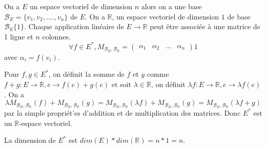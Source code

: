 \documentclass[]{book}
\theoremstyle{definition}
\newcommand{\bb}[1]{\mathbb{#1}}
\newcommand{\R}{\bb{R}}
\begin{document}
On a $E$ un espace vectoriel de dimension $n$ alors on a une base $\mathcal{B}_{E} = \{v_1, v_2, ...., v_n\}$ de $E$. On a $\R$, un espace vectoriel de dimension $1$ de base $\mathcal{B}_{\R}\{1\}$. Chaque application lin\'eaire de $E \to \R$ peut \^etre associ\'ee \`a une matrice de 1 ligne et $n$ colonnes. 
$$
\forall f \in E^{*},  M_{\mathcal{B}_{E}, \mathcal{B}_{\R}} = \begin{pmatrix} \alpha_1 & \alpha_2 & \ldots & \alpha_n  \end{pmatrix} 1
$$
avec $\alpha_i = f(v_i)$.

Pour $f, g \in E^{*}$, on d\'efinit la somme de $f$ et $g$ comme $f+g : E \to \R, e \to f(e) + g(e)$ et soit $\lambda \in \R$, on d\'efinit $\lambda f : E \to \R, e \to \lambda f(e)$. On a 
$$
 \lambda M_{\mathcal{B}_{E}, \mathcal{B}_{\R}}(f) + M_{\mathcal{B}_{E}, \mathcal{B}_{\R}}(g) = M_{\mathcal{B}_{E}, \mathcal{B}_{\R}}(\lambda f) + M_{\mathcal{B}_{E}, \mathcal{B}_{\R}}(g) = M_{\mathcal{B}_{E}, \mathcal{B}_{\R}} (\lambda f + g) 
$$
par la simple propri\'et'es d'addition et de multiplication des matrices. Donc $E^{*}$ est un $\R$-espace vectoriel.

La dimension de $E^{*}$ est $dim(E) * dim(\R) = n*1 = n$.
\end{document}
